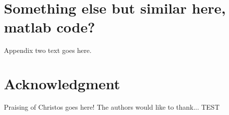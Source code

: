 \documentclass[journal]{IEEEtran}
\begin{document}
	\section{Something else but similar here, matlab code?}
	Appendix two text goes here.
	
	
	\section*{Acknowledgment}
	
	Praising of Christos goes here!
	The authors would like to thank...
	TEST
	
	
	\ifCLASSOPTIONcaptionsoff
	\newpage
	\fi
	
	
	
	
	
	
	
	
	
	
	
	
	
	
	
\end{document}
